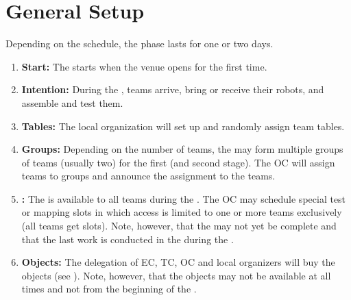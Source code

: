 \section{General Setup}
\label{sec:general_setup}
Depending on the schedule, the  phase lasts for one or two days.

\begin{enumerate}
	\item \textbf{Start:} The  starts when the venue opens for the first time.
	\item \textbf{Intention:} During the , teams arrive, bring or receive their robots, and assemble and test them.
	\item \textbf{Tables:} The local organization will set up and randomly assign team tables.
	\item \textbf{Groups:} Depending on the number of teams, the \OC{} may form multiple groups of teams (usually two) for the first (and second stage). The OC will assign teams to groups and announce the assignment to the teams.
	\item \textbf{\Arena{}:} The \Arena{} is available to all teams during the . The OC may schedule special test or mapping slots in which \Arena{} access is limited to one or more teams exclusively (all teams get slots). Note, however, that the \Arena{} may not yet be complete and that the last work is conducted in the \Arena{} during the \SetupDays.
	\item \textbf{Objects:} The delegation of EC, TC, OC and local organizers will buy the objects (see \Rulebook). Note, however, that the objects may not be available at all times and not from the beginning of the .
\end{enumerate}

